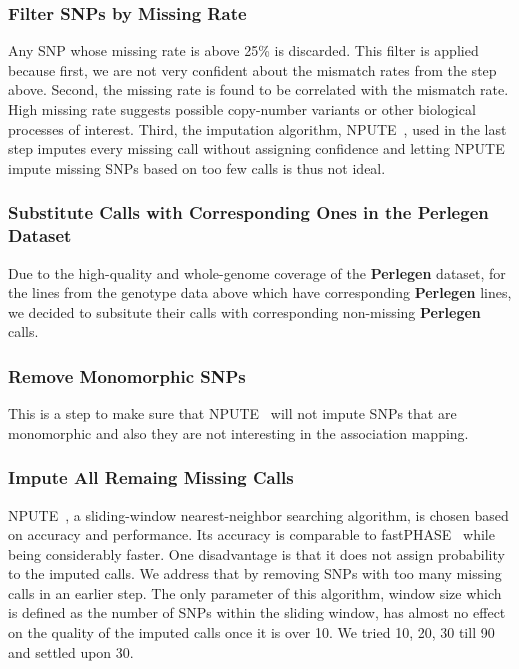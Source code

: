 \documentclass[a4paper,10pt]{article}
\begin{document}
\subsubsection{Filter SNPs by Missing Rate}
Any SNP whose missing rate is above 25\% is discarded. This filter is applied because first, we are not very confident about the mismatch rates from the step above. Second, the missing rate is found to be correlated with the mismatch rate. High missing rate suggests possible copy-number variants or other biological processes of interest. Third, the imputation algorithm, NPUTE~\cite{RobertsEtAl2007}, used in the last step imputes every missing call without assigning confidence and letting NPUTE impute missing SNPs based on too few calls is thus not ideal.

\subsubsection{Substitute Calls with Corresponding Ones in the \textbf{Perlegen} Dataset}
Due to the high-quality and whole-genome coverage of the \textbf{Perlegen} dataset, for the lines from the genotype data above which have corresponding \textbf{Perlegen} lines, we decided to subsitute their calls with corresponding non-missing \textbf{Perlegen} calls.

\subsubsection{Remove Monomorphic SNPs}
This is a step to make sure that NPUTE~\cite{RobertsEtAl2007} will not impute SNPs that are monomorphic and also they are not interesting in the association mapping.
\subsubsection{Impute All Remaing Missing Calls}
NPUTE~\cite{RobertsEtAl2007}, a sliding-window nearest-neighbor searching algorithm, is chosen based on accuracy and performance. Its accuracy is comparable to fastPHASE~\cite{ScheetStephens2006} while being considerably faster. One disadvantage is that it does not assign probability to the imputed calls. We address that by removing SNPs with too many missing calls in an earlier step. The only parameter of this algorithm, window size which is defined as the number of SNPs within the sliding window, has almost no effect on the quality of the imputed calls once it is over 10. We tried 10, 20, 30 till 90 and settled upon 30.
\end{document}
